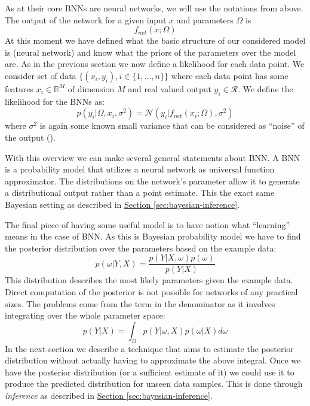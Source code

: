\documentclass[12pt,a4paper,twoside]{scrartcl}
\numberwithin{equation}{section}
\newcommand{\refsec}[1]{\hyperref[#1]{Section \ref*{#1}}}
\begin{document}
As at their core BNNs are neural networks, we will use the notations from above. The output of the network for a given input \(x\) and parameters \(\Omega\) is
\begin{equation}
   f_{net}(x;\Omega)
\end{equation}
At this moment we have defined what the basic structure of our considered model is (neural network) and know what the priors of the parameters over the model are. As in the previous section we now define a likelihood for each data point. We consider set of data \(\{(x_i, y_i), i\in\{1,...,n\} \}\) where each data point has some features \(x_i\in\mathbb{R}^M\) of dimension \(M\) and real valued output \(y_i\in\mathcal{R}\). We define the likelihood for the BNNs as:
\begin{equation}
  p(y_i|\Omega, x_i, \sigma^2) = \mathcal{N}(y_i |f_{net}(x_i;\Omega), \sigma^2)
\end{equation}
where \(\sigma^{\text{2}}\) is again some known small variance that can be considered as ``noise'' of the output (\cite{gal2016}).

With this overview we can make several general statements about BNN. A BNN is a probability model that utilizes a neural network as universal function approximator. The distributions on the network's parameter allow it to generate a distributional output rather than a point estimate. This the exact same Bayesian setting as described in \refsec{sec:bayesian-inference}. 

The final piece of having some useful model is to have notion what ``learning'' means in the case of BNN. As this is Bayesian probability model we have to find the posterior distribution over the parameters based on the example data:
\begin{equation}
  p(\omega|Y,X)=\frac{p(Y|X,\omega)p(\omega)}{p(Y|X)}
\end{equation}
This distribution describes the most likely parameters given the example data. Direct computation of the posterior is not possible for networks of any practical sizes. The problems come from the term in the denominator as it involves integrating over the whole parameter space:
\begin{equation}
  p(Y|X) = \int_{\Omega} p(Y|\omega , X)p(\omega|X)d \omega
\end{equation}
In the next section we describe a technique that aims to estimate the posterior distribution without actually having to approximate the above integral. Once we have the posterior distribution (or a sufficient estimate of it) we could use it to produce the predicted distribution for unseen data samples. This is done through \emph{inference} as described in \refsec{sec:bayesian-inference}.
\end{document}
